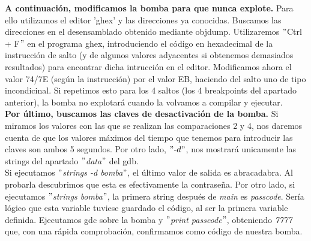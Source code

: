 \documentclass[11pt,a4paper]{article}
\begin{document}
\textbf{A continuación, modificamos la bomba para que nunca explote.}  Para ello utilizamos el editor 'ghex' y las direcciones ya conocidas. Buscamos las direcciones en el desensamblado obtenido mediante objdump. Utilizaremos $"$Ctrl + F$"$ en el programa ghex, introduciendo el código en hexadecimal de la instrucción de salto (y de algunos valores adyacentes si obtenemos demasiados resultados) para encontrar dicha intrucción en el editor. Modificamos ahora el valor 74/7E (según la instrucción) por el valor EB, haciendo del salto uno de tipo incondicinal. Si repetimos esto para los 4 saltos (los 4 breakpoints del apartado anterior), la bomba no explotará cuando la volvamos a compilar y ejecutar. \\


\textbf{Por último, buscamos las claves de desactivación de la bomba.} Si miramos los valores con las que se realizan las comparaciones 2 y 4, nos daremos cuenta de que los valores máximos del tiempo que tenemos para introducir las claves son ambos 5 segundos. Por otro lado, $"$-$d"$, nos mostrará unicamente las strings del apartado $"$\emph{data}$"$ del gdb. \\

Si ejecutamos $"$\emph{strings -d bomba}$"$, el último valor de salida es abracadabra. Al probarla descubrimos que esta es efectivamente la contraseña. Por otro lado, si ejecutamos $"$\emph{strings bomba}$"$, la primera string después de \emph{main} es \emph{passcode}. Sería lógico que esta variable tuviese guardado el código, al ser la primera variable definida. Ejecutamos gdc sobre la bomba y $"$\emph{print passcode}$"$, obteniendo \emph{7777} que, con una rápida comprobación, confirmamos como código de nuestra bomba. \\

%

\end{document}
